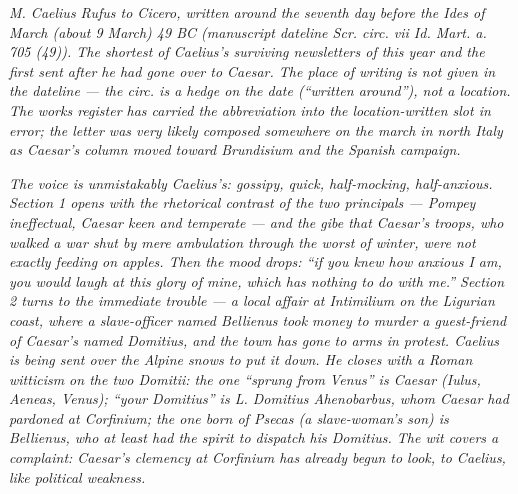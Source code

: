 
\textit{M. Caelius Rufus to Cicero, written around the
seventh day before the Ides of March (about 9 March) 49
BC (manuscript dateline \textit{Scr. circ. vii Id. Mart.
a. 705 (49)}). The shortest of Caelius's surviving
newsletters of this year and the first sent after he had
gone over to Caesar. The place of writing is not given
in the dateline --- the \textit{circ.} is a hedge on the
date (``written around''), not a location. The works
register has carried the abbreviation into the
location-written slot in error; the letter was very
likely composed somewhere on the march in north Italy as
Caesar's column moved toward Brundisium and the Spanish
campaign.}

\textit{The voice is unmistakably Caelius's: gossipy,
quick, half-mocking, half-anxious. Section 1 opens with
the rhetorical contrast of the two principals --- Pompey
ineffectual, Caesar keen and temperate --- and the
gibe that Caesar's troops, who walked a war shut by mere
ambulation through the worst of winter, were not exactly
feeding on apples. Then the mood drops: ``if you knew
how anxious I am, you would laugh at this glory of mine,
which has nothing to do with me.'' Section 2 turns to
the immediate trouble --- a local affair at Intimilium
on the Ligurian coast, where a slave-officer named
Bellienus took money to murder a guest-friend of
Caesar's named Domitius, and the town has gone to arms
in protest. Caelius is being sent over the Alpine snows
to put it down. He closes with a Roman witticism on the
two Domitii: the one ``sprung from Venus'' is Caesar
(Iulus, Aeneas, Venus); ``your Domitius'' is L. Domitius
Ahenobarbus, whom Caesar had pardoned at Corfinium; the
one born of Psecas (a slave-woman's son) is Bellienus,
who at least had the spirit to dispatch his Domitius.
The wit covers a complaint: Caesar's clemency at
Corfinium has already begun to look, to Caelius, like
political weakness.}
